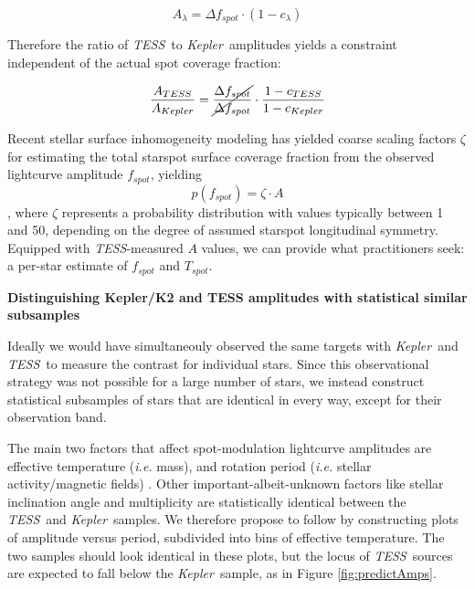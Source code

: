 \documentclass[letterpaper,11pt]{article}
\newcommand{\tess}{{\it TESS}}
\newcommand{\kepler}{{\it Kepler}}
\begin{document}
$$ A_\lambda = \Delta f_{spot} \cdot (1-c_\lambda)$$

Therefore the ratio of \tess\ to \kepler\ amplitudes yields a constraint independent of the actual spot coverage fraction:

$$ \frac{A_{TESS}}{A_{Kepler}} = \cancel{\frac{\Delta f_{spot}}{\Delta f_{spot}}} \cdot \frac{1-c_{TESS}}{1-c_{Kepler}} $$

Recent stellar surface inhomogeneity modeling \citep{2018ApJ...853..122R, 2018ApJ...868..143G, 2018ApJ...865..142B} has yielded coarse scaling factors $\zeta$ for estimating the total starspot surface coverage fraction from the observed lightcurve amplitude $f_{spot}$, yielding $$ p(f_{spot}) = \zeta \cdot A $$, where $\zeta$ represents a probability distribution with values typically between 1 and 50, depending on the degree of assumed starspot longitudinal symmetry.  Equipped with \tess-measured $A$ values, we can provide what practitioners seek: a per-star estimate of $f_{spot}$ and $T_{spot}$.

\textbf{Distinguishing Kepler/K2 and TESS amplitudes with statistical similar subsamples}

Ideally we would have simultaneouly observed the same targets with \kepler\ and \tess\ to measure the contrast for individual stars.  Since this observational strategy was not possible for a large number of stars, we instead construct statistical subsamples of stars that are identical in every way, except for their observation band.

The main two factors that affect spot-modulation lightcurve amplitudes are effective temperature (\emph{i.e.} mass), and rotation period (\emph{i.e.} stellar activity/magnetic fields) \citep{2014ApJS..211...24M}.  Other important-albeit-unknown factors like stellar inclination angle and multiplicity are statistically identical between the \tess\ and \kepler\ samples.  We therefore propose to follow \citet{2014ApJS..211...24M} by constructing plots of amplitude versus period, subdivided into bins of effective temperature.  The two samples should look identical in these plots, but the locus of \tess\ sources are expected to fall below the \kepler\ sample, as in Figure \ref{fig:predictAmps}.
\end{document}
